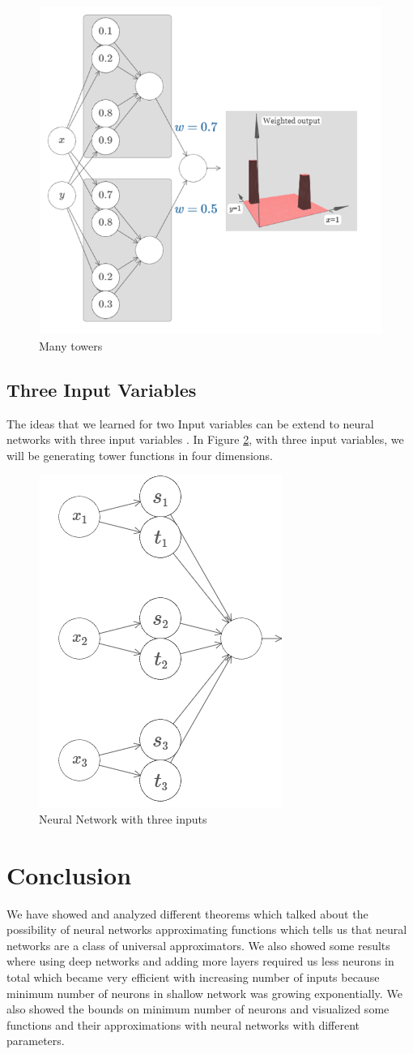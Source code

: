 \documentclass{article}
\begin{document}
\begin{figure}[h!]
    \centering
    \includegraphics[width=0.5 \textwidth]{Images/2/19.png}
    \caption{Many towers}
    \label{fig:figure18}
\end{figure}
\newpage
\subsection{Three Input Variables}
The ideas that we learned for two Input variables can be extend to neural networks with three input variables . In Figure \ref{fig:figure19}, with three input variables, we will be generating tower functions in four dimensions.
\begin{figure}[h!]
    \centering
    \includegraphics[width=0.3 \textwidth]{Images/2/21.png}
    \caption{Neural Network with three inputs}
    \label{fig:figure19}
\end{figure}
\newpage

\section{Conclusion}
We have showed and analyzed different theorems which talked about the possibility of neural networks approximating functions which tells us that neural networks are a class of universal approximators. We also showed some results where using deep networks and adding more layers required us less neurons in total which became very efficient with increasing number of inputs because minimum number of neurons in shallow network was growing exponentially. We also showed the bounds on minimum number of neurons and visualized some functions and their approximations with neural networks with different parameters.



\end{document}
